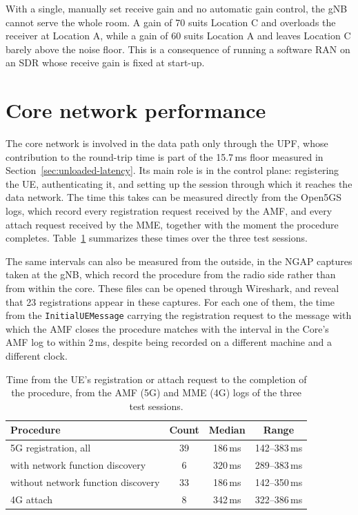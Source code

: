 With a single, manually set receive gain and no automatic gain control, the \gls{gNB} cannot serve the whole room. A gain of 70 suits Location C and overloads the receiver at Location A, while a gain of 60 suits Location A and leaves Location C barely above the noise floor. This is a consequence of running a software \gls{RAN} on an \gls{SDR} whose receive gain is fixed at start-up.

\section{Core network performance}
\label{sec:core-performance}

The core network is involved in the data path only through the \gls{UPF}, whose contribution to the round-trip time is part of the 15.7\,ms floor measured in Section~\ref{sec:unloaded-latency}. Its main role is in the control plane: registering the \gls{UE}, authenticating it, and setting up the session through which it reaches the data network. The time this takes can be measured directly from the Open5GS logs, which record every registration request received by the \gls{AMF}, and every attach request received by the \gls{MME}, together with the moment the procedure completes. Table~\ref{tab:registration-time} summarizes these times over the three test sessions.

The same intervals can also be measured from the outside, in the \gls{NGAP} captures taken at the \gls{gNB}, which record the procedure from the radio side rather than from within the core. These files can be opened through Wireshark, and reveal that 23 registrations appear in these captures. For each one of them, the time from the \texttt{InitialUEMessage} carrying the registration request to the message with which the \gls{AMF} closes the procedure matches with the interval in the Core's \gls{AMF} log to within 2\,ms, despite being recorded on a different machine and a different clock.

\begin{table}[htbp]
    \centering
    \begin{tabular}{|l|c|c|c|}
        \hline
        \textbf{Procedure} & \textbf{Count} & \textbf{Median} & \textbf{Range} \\
        \hline
        5G registration, all & 39 & 186\,ms & 142--383\,ms \\
        \hline
        \quad with network function discovery & 6 & 320\,ms & 289--383\,ms \\
        \hline
        \quad without network function discovery & 33 & 186\,ms & 142--350\,ms \\
        \hline
        4G attach & 8 & 342\,ms & 322--386\,ms \\
        \hline
    \end{tabular}
    \caption[5G registration and 4G attach times.]{Time from the \gls{UE}'s registration or attach request to the completion of the procedure, from the \gls{AMF} (5G) and \gls{MME} (4G) logs of the three test sessions.}
    \label{tab:registration-time}
\end{table}

